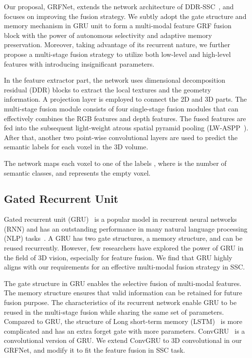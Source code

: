 \documentclass[10pt,twocolumn,letterpaper]{article}
\begin{document}
Our proposal, GRFNet, extends the network architecture of DDR-SSC~\cite{li2019rgbd}, and focuses on improving the fusion strategy.
We subtly adopt the gate structure and memory mechanism in GRU unit to form a multi-modal feature GRF fusion block with the power of autonomous selectivity and adaptive memory preservation.
Moreover, taking advantage of its recurrent nature, we further propose a multi-stage fusion strategy to utilize both low-level and high-level features with introducing insignificant parameters. 


In the feature extractor part, the network uses dimensional decomposition residual (DDR) blocks to extract the local textures and the geometry information. A projection layer is employed to connect the 2D and 3D parts. The multi-stage fusion module consists of four single-stage fusion modules that can effectively combines the RGB features and depth features.
The fused features are fed into the subsequent light-weight atrous spatial pyramid pooling (LW-ASPP~\cite{li2019rgbd}).
After that, another two point-wise convolutional layers are used to predict the semantic labels for each voxel in the 3D volume. 

The network maps each voxel to one of the labels , where  is the number of semantic classes, and  represents the empty voxel.


\subsection{Gated Recurrent Unit}
Gated recurrent unit (GRU)~\cite{cho2014learning} is a popular model in recurrent neural networks (RNN) and has an outstanding performance in many natural language processing (NLP) tasks~\cite{chorowski2015attention,kim2016character}.
A GRU has two gate structures, a memory structure, and can be reused recurrently.
However, few researchers have explored the power of GRU in the field of 3D vision, especially for feature fusion.
We find that GRU highly aligns with our requirements for an effective multi-modal fusion strategy in SSC. 

The gate structure in GRU enables the selective fusion of multi-modal features.
The memory structure ensures that valid information can be retained for future fusion purpose.
The characteristics of its recurrent network enable GRU to be reused in the multi-stage fusion while sharing the same set of parameters.
Compared to GRU, the structure of Long short-term memory (LSTM)~\cite{hochreiter1997long} is more complicated and has an extra forget gate with more parameters.
ConvGRU~\cite{ballas2015delving} is a convolutional version of GRU.  We extend ConvGRU to 3D convolutional in our GRFNet, and modify it to fit the feature fusion in SSC task.
\end{document}
